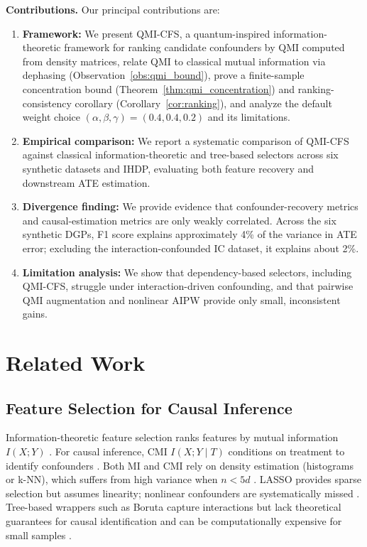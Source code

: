 \documentclass{svproc}
\begin{document}
\textbf{Contributions.} Our principal contributions are:
\begin{enumerate}
    \item \textbf{Framework:} We present QMI-CFS, a quantum-inspired information-theoretic framework for ranking candidate confounders by QMI computed from density matrices, relate QMI to classical mutual information via dephasing (Observation~\ref{obs:qmi_bound}), prove a finite-sample concentration bound (Theorem~\ref{thm:qmi_concentration}) and ranking-consistency corollary (Corollary~\ref{cor:ranking}), and analyze the default weight choice $(\alpha,\beta,\gamma)=(0.4,0.4,0.2)$ and its limitations.
    \item \textbf{Empirical comparison:} We report a systematic comparison of QMI-CFS against classical information-theoretic and tree-based selectors across six synthetic datasets and IHDP, evaluating both feature recovery and downstream ATE estimation.
    \item \textbf{Divergence finding:} We provide evidence that confounder-recovery metrics and causal-estimation metrics are only weakly correlated. Across the six synthetic DGPs, F1 score explains approximately 4\% of the variance in ATE error; excluding the interaction-confounded IC dataset, it explains about 2\%.
    \item \textbf{Limitation analysis:} We show that dependency-based selectors, including QMI-CFS, struggle under interaction-driven confounding, and that pairwise QMI augmentation and nonlinear AIPW provide only small, inconsistent gains.
\end{enumerate}

\section{Related Work}
\label{sec:related}

\subsection{Feature Selection for Causal Inference}

Information-theoretic feature selection ranks features by mutual information $I(X;Y)$ \cite{koller1996toward}. For causal inference, CMI $I(X;Y \mid T)$ conditions on treatment to identify confounders \cite{yu2020causality}. Both MI and CMI rely on density estimation (histograms or k-NN), which suffers from high variance when $n < 5d$ \cite{kraskov2004estimating}. LASSO provides sparse selection but assumes linearity; nonlinear confounders are systematically missed \cite{belloni2014inference}. Tree-based wrappers such as Boruta capture interactions but lack theoretical guarantees for causal identification and can be computationally expensive for small samples \cite{kursa2010boruta}.
\end{document}
